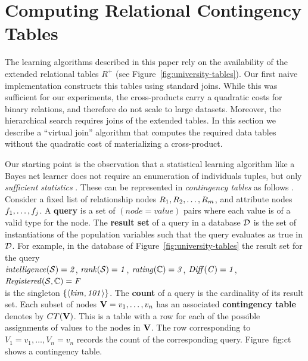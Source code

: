 \documentclass{article}
\begin{document}
\section{Computing Relational Contingency Tables} \label{sec:mobius}

The learning algorithms described in this paper rely on the  availability of the extended relational tables $R^{+}$ (see Figure~\ref{fig:university-tables}). Our first naive implementation constructs this tables using standard joins. While this was sufficient for our experiments, the cross-products carry a quadratic costs for binary relations, and therefore do not scale to large datasets. Moreover, the hierarchical search requires joins of the extended tables. In this section we describe a ``virtual join'' algorithm that computes the required data tables without the quadratic cost of materializing a cross-product. 

Our starting point is the observation that a statistical learning algorithm like a Bayes net learner does not require an enumeration of individuals tuples, but only {\em sufficient statistics} \cite{Heckerman1995,Schulte2011}. These can be represented in {\em contingency tables} as follows \cite{Moore1998}. Consider a fixed list of relationship nodes $\R_{1}, R_{2},\ldots,R_{m}$, and attribute nodes $\functor_{1},\ldots,\functor_{j}$. A \textbf{query} is a set of $(node = value)$ pairs where each value is of a valid type for the node. The \textbf{result set} of a query in a database $\D$ is the set of instantiations of the population variables such that the query evaluates as true in $\D$. For example, in the database of Figure~\ref{fig:university-tables} the result set for the query\\ $\it{intelligence}(\S) = 2$, $\it{rank}(\S) = 1$, $\it{rating}(\C) = 3$, $\it{Diff}(C) = 1$, $\it{Registered}(\S,\C) = F$\\ is the singleton $\{\langle \it{kim}, \it{101}\rangle\}$. The \textbf{count} of a query is the cardinality of its result set. Each subset of nodes $\set{V} = v_{1},\ldots,v_{n}$ has an associated \textbf{contingency table} denotes by $CT(\set{V})$. This is a table with a row for each of the possible assignments of values to the nodes in $\set{V}$. The row corresponding to $V_{1} = v_{1},\ldots,V_{n} = v_{n}$ records the count of the corresponding query. 
Figure~{fig:ct} shows a contingency table.
\end{document}
